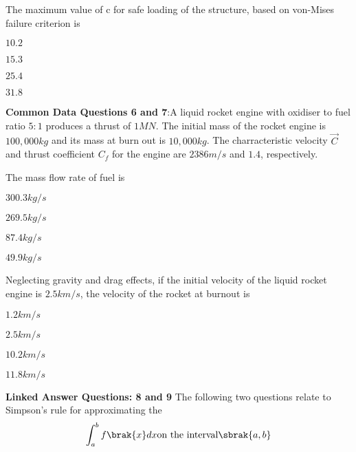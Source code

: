 \item The maximum value of c for safe loading of the structure, based on von-Mises failure criterion is 
\begin{enumerate}
\begin{multicols}{4}
    \item $ 10.2 $
    \item $15.3$
    \item $25.4$
    \item $31.8$
    \end{multicols}
\end{enumerate}

\item[] \textbf{Common Data Questions 6 and 7}:A liquid rocket engine with oxidiser to fuel ratio $5:1$ produces a thrust of $1 MN$. The initial mass of the rocket engine is $ 100,000 kg$ and its mass at burn out is $ 10,000kg $. The charracteristic velocity $\vec{C}$ and thrust coefficient $C_{f}$ for the engine are $2386 m/s$  and $1.4$, respectively.

\item The mass flow rate of fuel is 
\begin{enumerate}
\begin{multicols}{4}
    \item $ 300.3 kg/s$
    \item $269.5 kg/s$
    \item $87.4 kg/s$
    \item $49.9 kg/s$
\end{multicols}
\end{enumerate}

\item Neglecting gravity and drag effects, if the initial velocity of the liquid rocket engine is $2.5 km/s $, the velocity of the rocket at burnout is
\begin{enumerate}
\begin{multicols}{4}
    \item $ 1.2 km/s$
    \item $ 2.5 km/s$
    \item $ 10.2 km/s$
    \item $ 11.8 km/s$
 \end{multicols}
\end{enumerate}

\item[] \textbf{Linked Answer Questions: 8 and 9}
The following two questions relate to Simpson's rule for approximating the 
\begin{align}
\int_{a}^{b} f\brak{x} dx \text{on the interval} \sbrak{a, b}
\end{align}


